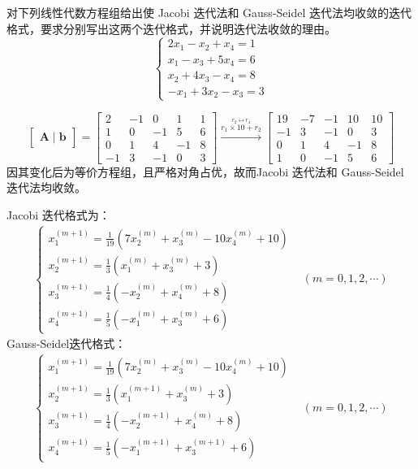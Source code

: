 \begin{example}
    对下列线性代数方程组给出使 Jacobi 迭代法和 Gauss-Seidel 迭代法均收敛的迭代格式，要求分别写出这两个迭代格式，并说明迭代法收敛的理由。
    \[
        \left\{
            \begin{array}{l}
                2x_1-x_2+x_4=1\\
                x_1-x_3+5x_4=6\\
                x_2+4x_3-x_4=8\\
                -x_1+3x_2-x_3=3
            \end{array}
        \right.
    \]
\end{example}

\begin{solution}
    \[
        \begin{bmatrix}
            \boldsymbol{A} \mid \boldsymbol{b}
        \end{bmatrix}=
        \begin{bmatrix}
            2&-1&0&1&1\\1&0&-1&5&6\\0&1&4&-1&8\\-1&3&-1&0&3
        \end{bmatrix}
        \xrightarrow{\stackrel{r_2\leftrightarrow r_4}{r_1\times 10+r_2}}
        \begin{bmatrix}
            19&-7&-1&10&10\\-1&3&-1&0&3\\0&1&4&-1&8\\1&0&-1&5&6
        \end{bmatrix}
    \]
    因其变化后为等价方程组，且严格对角占优，故而Jacobi 迭代法和 Gauss-Seidel 迭代法均收敛。

    Jacobi 迭代格式为：
    \[
        \begin{aligned}
            \begin{cases}
                x_1^{(m+1)}=\frac{1}{19}(7x_2^{(m)}+x_3^{(m)}-10x_4^{(m)}+10)\\
                x_2^{(m+1)}=\frac{1}{3}(x_1^{(m)}+x_3^{(m)}+3)\\
                x_3^{(m+1)}=\frac{1}{4}(-x_2^{(m)}+x_4^{(m)}+8)\\
                x_4^{(m+1)}=\frac{1}{5}(-x_1^{(m)}+x_3^{(m)}+6)
            \end{cases}
            & (m=0,1,2,\cdots)
        \end{aligned}  
    \]
    Gauss-Seidel迭代格式：
    \[
        \begin{aligned}
            \begin{cases}
                x_1^{(m+1)}=\frac{1}{19}(7x_2^{(m)}+x_3^{(m)}-10x_4^{(m)}+10)\\
                x_2^{(m+1)}=\frac{1}{3}(x_1^{(m+1)}+x_3^{(m)}+3)\\
                x_3^{(m+1)}=\frac{1}{4}(-x_2^{(m+1)}+x_4^{(m)}+8)\\
                x_4^{(m+1)}=\frac{1}{5}(-x_1^{(m+1)}+x_3^{(m+1)}+6)
            \end{cases}
            & (m=0,1,2,\cdots)
        \end{aligned}  
    \]
\end{solution}
